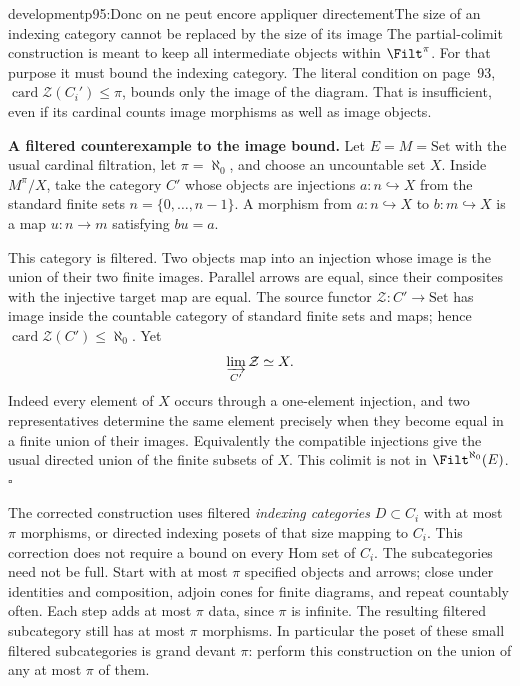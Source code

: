 \begin{dcomment}{development}{p95:Donc on ne peut encore appliquer directement}{The size of an indexing category cannot be replaced by the size of its image}
The partial-colimit construction is meant to keep all intermediate objects within $\Filt^\pi$. For that purpose it must bound the indexing category. The literal condition on page~93, $\operatorname{card}\mathcal Z(C_i')\leq\pi$, bounds only the image of the diagram. That is insufficient, even if its cardinal counts image morphisms as well as image objects.

\textbf{A filtered counterexample to the image bound.}\ours
Let $E=M=\mathrm{Set}$ with the usual cardinal filtration, let $\pi=\aleph_0$, and choose an uncountable set $X$. Inside $M^\pi/X$, take the category $C'$ whose objects are injections $a:n\hookrightarrow X$ from the standard finite sets $n=\{0,\ldots,n-1\}$. A morphism from $a:n\hookrightarrow X$ to $b:m\hookrightarrow X$ is a map $u:n\to m$ satisfying $bu=a$.

This category is filtered. Two objects map into an injection whose image is the union of their two finite images. Parallel arrows are equal, since their composites with the injective target map are equal. The source functor $\mathcal Z:C'\to\mathrm{Set}$ has image inside the countable category of standard finite sets and maps; hence $\operatorname{card}\mathcal Z(C')\leq\aleph_0$. Yet
\[
 \varinjlim_{C'}\mathcal Z\simeq X.
\]
Indeed every element of $X$ occurs through a one-element injection, and two representatives determine the same element precisely when they become equal in a finite union of their images. Equivalently the compatible injections give the usual directed union of the finite subsets of $X$. This colimit is not in $\Filt^{\aleph_0}(E)$.\hfill$\square$

The corrected construction uses filtered \emph{indexing categories} $D\subset C_i$ with at most $\pi$ morphisms, or directed indexing posets of that size mapping to $C_i$. This correction does not require a bound on every Hom set of $C_i$. The subcategories need not be full. Start with at most $\pi$ specified objects and arrows; close under identities and composition, adjoin cones for finite diagrams, and repeat countably often. Each step adds at most $\pi$ data, since $\pi$ is infinite. The resulting filtered subcategory still has at most $\pi$ morphisms. In particular the poset of these small filtered subcategories is grand devant $\pi$: perform this construction on the union of any at most $\pi$ of them.


\end{dcomment}

